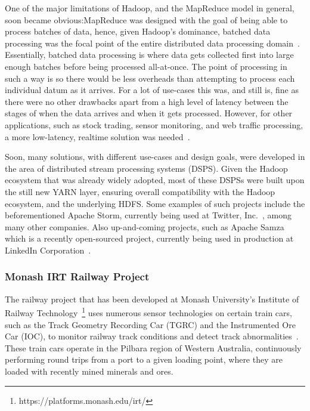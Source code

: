 One of the major limitations of Hadoop, and the MapReduce model in general, soon became obvious:\@ MapReduce was designed
with the goal of being able to process batches of data, hence, given Hadoop's dominance, batched data processing was the
focal point of the entire distributed data processing domain~\cite{kamburugamuve_survey_2014}. Essentially, batched data
processing is where data gets collected first into large enough batches before being processed all-at-once. The point of
processing in such a way is so there would be less overheads than attempting to process each individual datum as it
arrives. For a lot of use-cases this was, and still is, fine as there were no other drawbacks apart from a high level of
latency between the stages of when the data arrives and when it gets processed. However, for other applications, such as
stock trading, sensor monitoring, and web traffic processing, a more low-latency, realtime solution was
needed~\cite{kamburugamuve_survey_2014}.

Soon, many solutions, with different use-cases and design goals, were developed in the area of distributed stream
processing systems (DSPS). Given the Hadoop ecosystem that was already widely adopted, most of these DSPSs were built
upon the still new YARN layer, ensuring overall compatibility with the Hadoop ecosystem, and the underlying HDFS. Some
examples of such projects include the beforementioned Apache Storm, currently being used at Twitter,
Inc.~\cite{toshniwal_stormtwitter_2014}, among many other companies. Also up-and-coming projects, such as Apache Samza
which is a recently open-sourced project, currently being used in production at LinkedIn Corporation~\cite{web:Samza}.


\subsubsection{Monash IRT Railway Project} %
\label{sub:monash_irt_railway_project}

The railway project that has been developed at Monash University's Institute of Railway Technology~\footnote{https://platforms.monash.edu/irt/}
uses numerous sensor
technologies on certain train cars, such as the Track Geometry Recording Car (TGRC) and the Instrumented Ore Car (IOC),
to monitor railway track conditions and detect track abnormalities~\cite{darby2003development,darby2005track}.
These train cars operate in the Pilbara region of Western Australia, continuously performing round trips from a port
to a given loading point, where they are loaded with recently mined minerals and ores.

